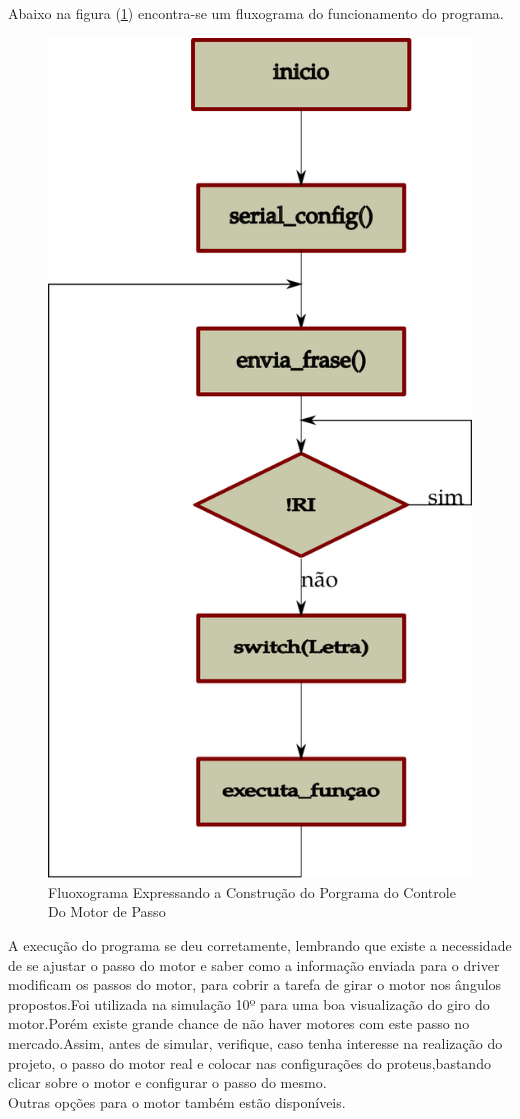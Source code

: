 \documentclass{Fabiano_file}
\begin{document}
{Abaixo na figura (\ref{fig:fluoxograma_motor_de_passo_em_C}) encontra-se um fluxograma do funcionamento do programa.

\begin{figure}[h!]
\centering
\includegraphics[width=.4\textwidth]{fluoxograma_motor_de_passo_em_C.pdf}
\caption{Fluoxograma Expressando a Construção do Porgrama do Controle Do Motor de Passo}
\label{fig:fluoxograma_motor_de_passo_em_C}
\end{figure}

A execução do programa se deu corretamente, lembrando que existe a necessidade de se ajustar o passo do motor  e saber como a informação enviada para o 
driver modificam os passos do motor, para cobrir a tarefa de girar o motor nos ângulos propostos.Foi utilizada na simulação 
10º para uma boa visualização do  giro do motor.Porém existe grande chance de não haver motores com este passo no mercado.Assim, antes de simular, verifique, caso 
tenha interesse na realização do projeto, o passo do motor real e colocar nas configurações do proteus,bastando clicar sobre o motor e configurar o passo do mesmo.\\
Outras opções para o motor também estão disponíveis.

\pagebreak

}
\end{document}
